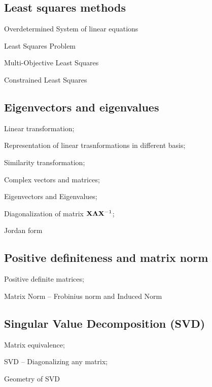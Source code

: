 \documentclass[fontsize=9pt]{scrbook}
\def\mf{\ensuremath\mathbf}
\begin{document}
\begin{multicols}{2}
\subsection*{Least squares methods}
\begin{enumerate*}
    \item Overdetermined System of linear equations
    \item Least Squares Problem
    \item Multi-Objective Least Squares
    \item Constrained Least Squares
\end{enumerate*}

\subsection*{Eigenvectors and eigenvalues}
\begin{enumerate*}
    \item Linear transformation;
    \item Representation of linear trasnformations in different basis;
    \item Similarity transformation;
    \item Complex vectors and matrices;
    \item Eigenvectors and Eigenvalues;
    \item Diagonalization of matrix $\mf{X}\mf{\Lambda}\mf{X}^{-1}$; 
    \item Jordan form
\end{enumerate*}

\subsection*{Positive definiteness and matrix norm }
\begin{enumerate*}
    \item Positive definite matrices;
    \item Matrix Norm -- Frobinius norm and Induced Norm
\end{enumerate*}

\subsection*{Singular Value Decomposition (SVD)}
\begin{enumerate*}
    \item Matrix equivalence;
    \item SVD -- Diagonalizing any matrix;
    \item Geometry of SVD
\end{enumerate*}


\end{multicols}
\end{document}
